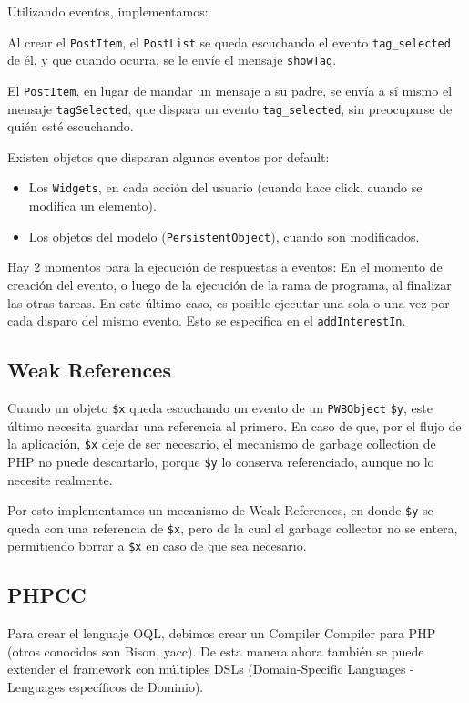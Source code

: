 Utilizando eventos, implementamos:


Al crear el \verb'PostItem', el \verb'PostList' se queda escuchando el evento \verb'tag_selected' de él, y que cuando ocurra, se le envíe el mensaje \verb'showTag'.


El \verb'PostItem', en lugar de mandar un mensaje a su padre, se envía a sí mismo el mensaje \verb'tagSelected', que dispara un evento \verb'tag_selected', sin preocuparse de quién esté escuchando.

Existen objetos que disparan algunos eventos por default:
\begin{itemize}
\item Los \verb"Widgets", en cada acción del usuario (cuando hace click, cuando se modifica un elemento).
\item Los objetos del modelo (\verb"PersistentObject"), cuando son modificados.
\end{itemize}

Hay 2 momentos para la ejecución de respuestas a eventos: En el momento de creación del evento, o luego de la ejecución de la rama de programa, al finalizar las otras tareas. En este último caso, es posible ejecutar una sola o una vez por cada disparo del mismo evento. Esto se especifica en el \verb'addInterestIn'.

\subsection{Weak References} \label{sub-weak}
Cuando un objeto \verb"$x" queda escuchando un evento de un \verb"PWBObject" \verb"$y", este último necesita guardar una referencia al primero. En caso de que, por el flujo de la aplicación, \verb'$x' deje de ser necesario, el mecanismo de garbage collection de PHP no puede descartarlo, porque \verb'$y' lo conserva referenciado, aunque no lo necesite realmente.

Por esto implementamos un mecanismo de Weak References, en donde \verb"$y" se queda con una referencia de \verb"$x", pero de la cual el garbage collector no se entera, permitiendo borrar a \verb"$x" en caso de que sea necesario.

\subsection{PHPCC}
\label{sub-phpcc}
Para crear el lenguaje OQL, debimos crear un Compiler Compiler para PHP (otros conocidos son Bison\cite{BISON}, yacc\cite{YACC}).
De esta manera ahora también se puede extender el framework con múltiples DSLs (Domain-Specific Languages - Lenguages específicos de Dominio).

